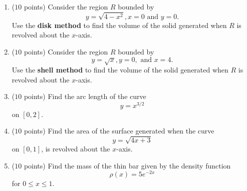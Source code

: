 \documentclass{article}
\begin{document}
\normalsize


\vfill

\newpage

\begin{enumerate}

\item ($10$ points) Consider the region $R$ bounded by
$$y = \sqrt{4 - x^{2}}, x = 0 \text{ and } y = 0.  $$
Use the {\bfseries disk method} to find the volume of the solid generated when $R$ is revolved about the $x$-axis.
\newpage

\item ($10$ points) Consider the region $R$ bounded by
$$y = \sqrt{x}, y= 0, \text{ and }x=4.$$
Use the {\bfseries shell method} to find the volume of the solid generated when $R$ is revolved about the $x$-axis.
\newpage
\item ($10$ points) Find the arc length of the curve
$$y = x^{3/2} $$
on $[0,2]$.

\newpage
\item ($10$ points) Find the area of the surface generated when the curve
$$y = \sqrt{4x + 3} $$
on $[0,1]$, is revolved about the $x$-axis.
\newpage
\item ($10$ points) Find the mass of the thin bar given by the density function
$$\rho(x) = 5 e^{-2x} $$
for $0 \le x \le 1$.

\end{enumerate}
\end{document}
